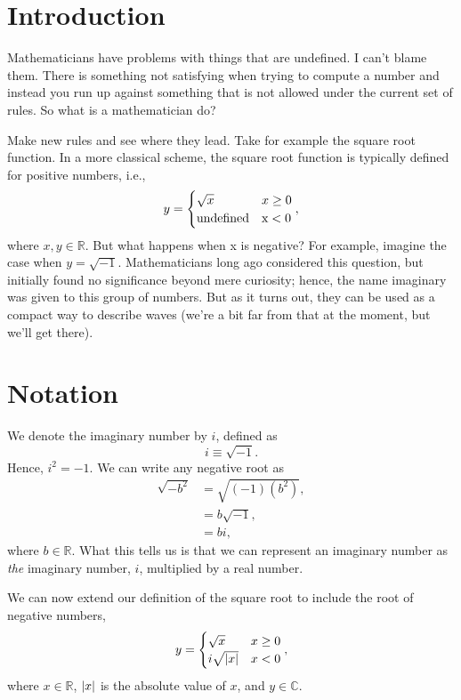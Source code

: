 \documentclass[final,a4paper,12pt]{article}
\theoremstyle{definition}
\begin{document}
\section{Introduction}
Mathematicians have problems with things that are undefined.  I can't blame them.
There is something not satisfying when trying to compute a number and instead
you run up against something that is not allowed under the current set of rules.
So what is a mathematician do?

Make new rules and see where they lead.  Take for example the square root
function.  In a more classical scheme, the square root function is
typically defined for positive numbers, i.e.,
\[
    y =
    \begin{cases}
        \sqrt{x} & x \geq 0 \\
        \mathrm{undefined} & \text x < 0 \\
    \end{cases} ,
\]
where $x, y \in \mathbb{R}$.  But what happens when x is negative?  For example,
imagine the case when $y = \sqrt{-1}$.  Mathematicians long ago considered this
question, but initially found no significance beyond mere curiosity; hence, the
name imaginary was given to this group of numbers.  But as it turns out, they
can be used as a compact way to describe waves (we're a bit far from that at the
moment, but we'll get there).

\section{Notation}
We denote the imaginary number by $i$, defined as
\begin{equation}
    i \equiv \sqrt{-1}.
\end{equation}
Hence, $i^2 = -1$.  We can write any negative root as
\begin{align*}
    \sqrt{-b^2} &= \sqrt{(-1)(b^2)}, \\
    &= b \sqrt{-1}, \\
    &= b i,
\end{align*}
where $b \in \mathbb{R}$.  What this tells us is that we can represent an
imaginary number as {\it the} imaginary number, $i$, multiplied by a real number.

We can now extend our definition of the square root to include the root of
negative numbers,
\begin{equation*}
    y = \begin{cases}
        \sqrt{x} & x \geq 0 \\
        i \sqrt{\abs{x}} & x < 0 \\
        \end{cases} ,
\end{equation*}
where $x \in \mathbb{R}$, $\abs{x}$ is the absolute value of $x$, and $y \in
\mathbb{C}$.
\end{document}
